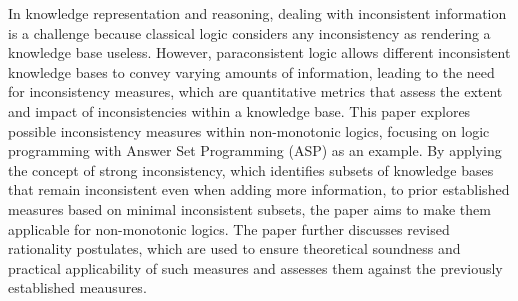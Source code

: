 In knowledge representation and reasoning, dealing with inconsistent information is a challenge because classical logic considers any inconsistency as rendering a knowledge base useless. However, paraconsistent logic allows different inconsistent knowledge bases to convey varying amounts of information, leading to the need for inconsistency measures, which are quantitative metrics that assess the extent and impact of inconsistencies within a knowledge base. This paper explores possible inconsistency measures within non-monotonic logics, focusing on logic programming with Answer Set Programming (ASP) as an example. By applying the concept of strong inconsistency, which identifies subsets of knowledge bases that remain inconsistent even when adding more information, to prior established measures based on minimal inconsistent subsets, the paper aims to make them applicable for non-monotonic logics. The paper further discusses revised rationality postulates, which are used to ensure theoretical soundness and practical applicability of such measures and assesses them against the previously established meausures.
